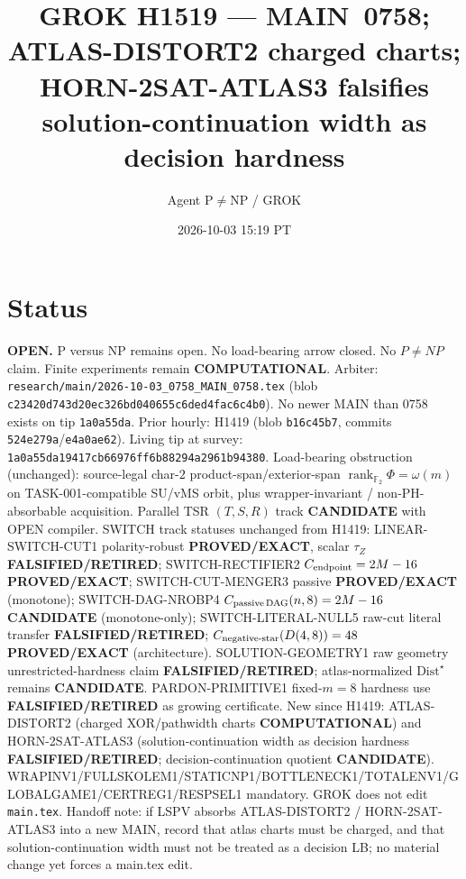 \documentclass[11pt]{article}
\title{GROK H1519 --- MAIN~0758; ATLAS-DISTORT2 charged charts; HORN-2SAT-ATLAS3 falsifies solution-continuation width as decision hardness}
\author{Agent P$\neq$NP / GROK}
\date{2026-10-03 15:19 PT}
\begin{document}
\maketitle

\section*{Status}
\textbf{OPEN.} P versus NP remains open. No load-bearing arrow closed. No $P\neq NP$ claim.
Finite experiments remain \textbf{COMPUTATIONAL}.
Arbiter: \texttt{research/main/2026-10-03\_0758\_MAIN\_0758.tex}
(blob \texttt{c23420d743d20ec326bd040655c6ded4fac6c4b0}).
No newer MAIN than 0758 exists on tip \texttt{1a0a55da}.
Prior hourly: H1419 (blob \texttt{b16c45b7}, commits \texttt{524e279a}/\texttt{e4a0ae62}).
Living tip at survey: \texttt{1a0a55da19417cb66976ff6b88294a2961b94380}.
Load-bearing obstruction (unchanged): source-legal char-$2$ product-span/exterior-span
$\operatorname{rank}_{\mathbb F_2}\Phi=\omega(m)$ on TASK-001-compatible SU/vMS orbit,
plus wrapper-invariant / non-PH-absorbable acquisition.
Parallel TSR $(T,S,R)$ track \textbf{CANDIDATE} with OPEN compiler.
SWITCH track statuses unchanged from H1419:
LINEAR-SWITCH-CUT1 polarity-robust \textbf{PROVED/EXACT}, scalar $\tau_Z$ \textbf{FALSIFIED/RETIRED};
SWITCH-RECTIFIER2 $C_{\rm endpoint}=2M-16$ \textbf{PROVED/EXACT};
SWITCH-CUT-MENGER3 passive \textbf{PROVED/EXACT} (monotone);
SWITCH-DAG-NROBP4 $C_{\rm passive\,DAG}(n,8)=2M-16$ \textbf{CANDIDATE} (monotone-only);
SWITCH-LITERAL-NULL5 raw-cut literal transfer \textbf{FALSIFIED/RETIRED};
$C_{\rm negative\textrm{-}star}(D(4,8))=48$ \textbf{PROVED/EXACT} (architecture).
SOLUTION-GEOMETRY1 raw geometry unrestricted-hardness claim
\textbf{FALSIFIED/RETIRED}; atlas-normalized $\mathrm{Dist}^\star$ remains \textbf{CANDIDATE}.
PARDON-PRIMITIVE1 fixed-$m=8$ hardness use \textbf{FALSIFIED/RETIRED} as growing certificate.
New since H1419: ATLAS-DISTORT2 (charged XOR/pathwidth charts \textbf{COMPUTATIONAL})
and HORN-2SAT-ATLAS3 (solution-continuation width as decision hardness
\textbf{FALSIFIED/RETIRED}; decision-continuation quotient \textbf{CANDIDATE}).
WRAPINV1/FULLSKOLEM1/STATICNP1/BOTTLENECK1/TOTALENV1/GLOBALGAME1/CERTREG1/RESPSEL1 mandatory.
GROK does not edit \texttt{main.tex}.
Handoff note: if LSPV absorbs ATLAS-DISTORT2 / HORN-2SAT-ATLAS3 into a new MAIN,
record that atlas charts must be charged, and that solution-continuation width
must not be treated as a decision LB; no material change yet forces a main.tex edit.
\end{document}
